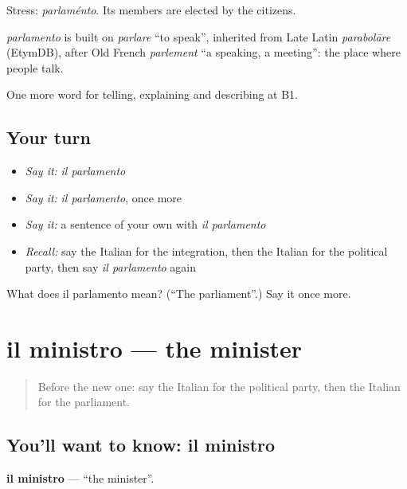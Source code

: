 Stress: \emph{parlaménto}. Its members are elected by the citizens.

\begin{cousinweb}
\emph{parlamento} is built on \emph{parlare} \textquotedblleft{}to speak\textquotedblright{}, inherited from Late Latin \emph{parabolāre} (EtymDB), after Old French \emph{parlement} \textquotedblleft{}a speaking, a meeting\textquotedblright{}: the place where people talk.
\end{cousinweb}

\begin{grammarlens}[title={What you've built}]
One more word for telling, explaining and describing at B1.
\end{grammarlens}

\subsection*{Your turn}
\begin{itemize}
\raggedright
  \item \emph{Say it:} \emph{il parlamento}
  \item \emph{Say it:} \emph{il parlamento}, once more
  \item \emph{Say it:} a sentence of your own with \emph{il parlamento}
  \item \emph{Recall:} say the Italian for the integration, then the Italian for the political party, then say \emph{il parlamento} again
\end{itemize}

\begin{tcolorbox}[breakable,colback=teal!4,colframe=teal!35!black,title={Before you move on}]
What does il parlamento mean? (\textquotedblleft{}The parliament\textquotedblright{}.) Say it once more.
\end{tcolorbox}
\section[il ministro]{il ministro — the minister}

\label{lesson:IT-C369-ministro}



\begin{quote}
Before the new one: say the Italian for the political party, then the Italian for the parliament.
\end{quote}

\subsection*{You'll want to know: il ministro}
\textbf{il ministro} — \textquotedblleft{}the minister\textquotedblright{}.


